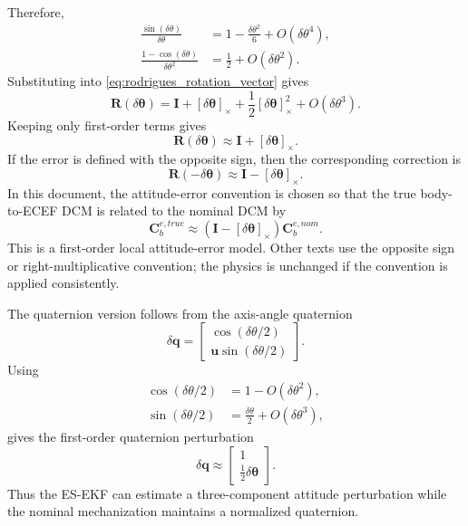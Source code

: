 \documentclass[11pt,oneside]{book}
\renewcommand{\skew}[1]{\left[#1\right]_{\times}}
\newcommand{\quat}{\mathbf{q}}
\newcommand{\I}{\mathbf{I}}
\begin{document}
Therefore,
\begin{align}
\frac{\sin(\delta\theta)}{\delta\theta} &= 1 - \frac{\delta\theta^2}{6} + O(\delta\theta^4),\\
\frac{1-\cos(\delta\theta)}{\delta\theta^2} &= \frac{1}{2} + O(\delta\theta^2).
\end{align}
Substituting into \cref{eq:rodrigues_rotation_vector} gives
\begin{equation}
\mathbf{R}(\delta\boldsymbol\theta)
= \I + \skew{\delta\boldsymbol\theta} + \frac{1}{2}\skew{\delta\boldsymbol\theta}^{2} + O(\delta\theta^3).
\end{equation}
Keeping only first-order terms gives
\begin{equation}
\mathbf{R}(\delta\boldsymbol\theta)
\approx \I + \skew{\delta\boldsymbol\theta}.
\label{eq:first_order_rotation_plus}
\end{equation}
If the error is defined with the opposite sign, then the corresponding correction is
\begin{equation}
\mathbf{R}(-\delta\boldsymbol\theta)
\approx \I - \skew{\delta\boldsymbol\theta}.
\label{eq:first_order_rotation_minus}
\end{equation}
In this document, the attitude-error convention is chosen so that the true body-to-ECEF DCM is related to the nominal DCM by
\begin{equation}
\mathbf{C}_{b}^{e,true}
\approx
\left(\I - \skew{\delta\boldsymbol\theta}\right)
\mathbf{C}_{b}^{e,nom}.
\label{eq:small_angle_dcm_relation}
\end{equation}
This is a first-order local attitude-error model. Other texts use the opposite sign or right-multiplicative convention; the physics is unchanged if the convention is applied consistently.

The quaternion version follows from the axis-angle quaternion
\begin{equation}
\delta\quat
=
\begin{bmatrix}
\cos(\delta\theta/2)\\
\mathbf{u}\sin(\delta\theta/2)
\end{bmatrix}.
\end{equation}
Using
\begin{align}
\cos(\delta\theta/2)&=1-O(\delta\theta^2),\\
\sin(\delta\theta/2)&=\frac{\delta\theta}{2}+O(\delta\theta^3),
\end{align}
gives the first-order quaternion perturbation
\begin{equation}
\delta\quat
\approx
\begin{bmatrix}
1\\
\frac{1}{2}\delta\boldsymbol\theta
\end{bmatrix}.
\label{eq:small_angle_quaternion}
\end{equation}
Thus the ES-EKF can estimate a three-component attitude perturbation while the nominal mechanization maintains a normalized quaternion.
\end{document}
